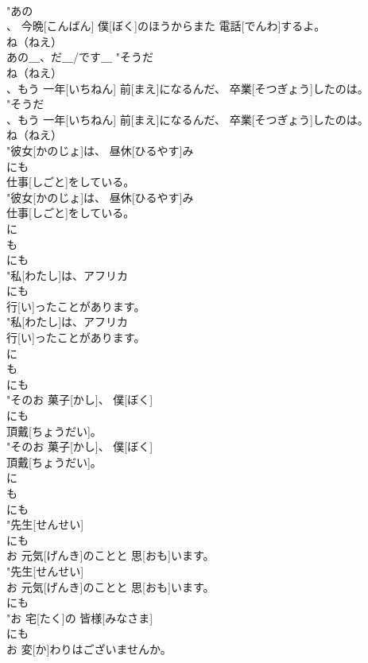 \documentclass[8pt]{extreport}
\begin{document}
\begin{CJK}{UTF8}{min}
\\	"あの
\\	、 今晩[こんばん] 僕[ぼく]のほうからまた 電話[でんわ]するよ。
\\	ね（ねえ）
\\	あの＿、だ＿/です＿	"そうだ
\\	ね（ねえ）
\\	、もう 一年[いちねん] 前[まえ]になるんだ、 卒業[そつぎょう]したのは。
\\	"そうだ
\\	、もう 一年[いちねん] 前[まえ]になるんだ、 卒業[そつぎょう]したのは。
\\	ね（ねえ）
\\	"彼女[かのじょ]は、 昼休[ひるやす]み
\\	にも
\\	仕事[しごと]をしている。
\\	"彼女[かのじょ]は、 昼休[ひるやす]み
\\	仕事[しごと]をしている。
\\	に 
\\	も 
\\	にも
\\	"私[わたし]は、アフリカ
\\	にも
\\	行[い]ったことがあります。
\\	"私[わたし]は、アフリカ
\\	行[い]ったことがあります。
\\	に 
\\	も 
\\	にも
\\	"そのお 菓子[かし]、 僕[ぼく]
\\	にも
\\	頂戴[ちょうだい]。
\\	"そのお 菓子[かし]、 僕[ぼく]
\\	頂戴[ちょうだい]。
\\	に 
\\	も 
\\	にも
\\	"先生[せんせい]
\\	にも
\\	お 元気[げんき]のことと 思[おも]います。
\\	"先生[せんせい]
\\	お 元気[げんき]のことと 思[おも]います。
\\	にも
\\	"お 宅[たく]の 皆様[みなさま]
\\	にも
\\	お 変[か]わりはございませんか。

\end{CJK}
\end{document}
